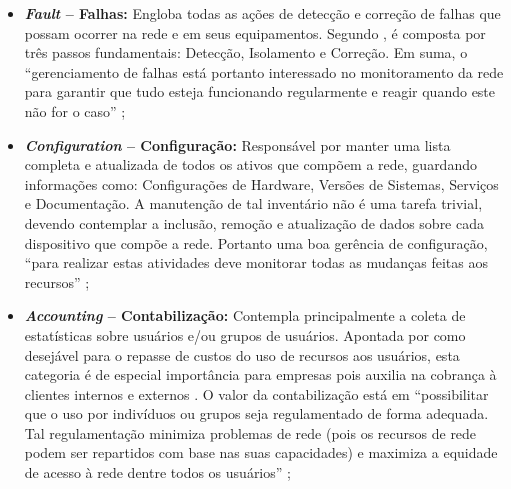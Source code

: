 \documentclass[twoside,english,brazilian]{UNISINOSmonografia}
\begin{document}
	\begin{itemize}
		\item \textbf{\textit{Fault} -- Falhas:} 
Engloba todas as ações de detecção e correção de falhas que possam ocorrer na 
rede e em seus equipamentos. 
Segundo , é composta por três passos fundamentais: 
Detecção, Isolamento e Correção. 
Em suma, o ``gerenciamento de falhas está portanto interessado no 
monitoramento da rede para garantir que tudo esteja funcionando regularmente e 
reagir quando este não for o caso'' \cite[p.~132]{Clemm2006};

		\item \textbf{\textit{Configuration} -- Configuração:}
Responsável por manter uma lista completa e atualizada de todos os ativos que 
compõem a rede, guardando informações como: Configurações de Hardware, Versões 
de Sistemas, Serviços e Documentação.
\cite{Clemm2006,Ding2009,Mauro2009}
A manutenção de tal inventário não é uma tarefa trivial, devendo contemplar a 
inclusão, remoção e atualização de dados sobre cada dispositivo que compõe a 
rede. 
Portanto uma boa gerência de configuração, ``para realizar estas 
atividades deve monitorar todas as mudanças feitas aos recursos'' 
\cite[p.~2]{Wang2012};

		\item \textbf{\textit{Accounting} -- Contabilização:}
Contempla principalmente a coleta de estatísticas sobre usuários e/ou grupos 
de usuários. 
Apontada por  como desejável para o repasse 
de custos do uso de recursos aos usuários, esta categoria é de especial 
importância para empresas pois auxilia na cobrança à clientes internos e 
externos \cite{Clemm2006}. 
O valor da contabilização está em ``possibilitar que o uso por indivíduos ou 
grupos seja regulamentado de forma adequada. Tal regulamentação minimiza 
problemas de rede (pois os recursos de rede podem ser repartidos com base nas 
suas capacidades) e maximiza a equidade de acesso à rede dentre todos os 
usuários'' 
\cite[p.~93]{Ding2009};


\end{itemize}
\end{document}
